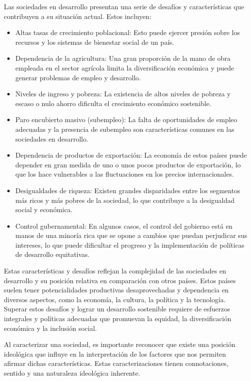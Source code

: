 \documentclass[
  a4paper,
]{article}
\providecommand{\tightlist}{%
  \setlength{\itemsep}{0pt}\setlength{\parskip}{0pt}}\usepackage{longtable,booktabs,array}
\begin{document}
Las sociedades en desarrollo presentan una serie de desafíos y
características que contribuyen a su situación actual. Estos incluyen:

\begin{itemize}
\tightlist
\item
  Altas tasas de crecimiento poblacional: Esto puede ejercer presión
  sobre los recursos y los sistemas de bienestar social de un país.
\item
  Dependencia de la agricultura: Una gran proporción de la mano de obra
  empleada en el sector agrícola limita la diversificación económica y
  puede generar problemas de empleo y desarrollo.
\item
  Niveles de ingreso y pobreza: La existencia de altos niveles de
  pobreza y escaso o nulo ahorro dificulta el crecimiento económico
  sostenible.
\item
  Paro encubierto masivo (subempleo): La falta de oportunidades de
  empleo adecuadas y la presencia de subempleo son características
  comunes en las sociedades en desarrollo.
\item
  Dependencia de productos de exportación: La economía de estos países
  puede depender en gran medida de uno o unos pocos productos de
  exportación, lo que los hace vulnerables a las fluctuaciones en los
  precios internacionales.
\item
  Desigualdades de riqueza: Existen grandes disparidades entre los
  segmentos más ricos y más pobres de la sociedad, lo que contribuye a
  la desigualdad social y económica.
\item
  Control gubernamental: En algunos casos, el control del gobierno está
  en manos de una minoría rica que se opone a cambios que puedan
  perjudicar sus intereses, lo que puede dificultar el progreso y la
  implementación de políticas de desarrollo equitativas.
\end{itemize}

Estas características y desafíos reflejan la complejidad de las
sociedades en desarrollo y su posición relativa en comparación con otros
países. Estos países suelen tener potencialidades productivas
desaprovechadas y dependencia en diversos aspectos, como la economía, la
cultura, la política y la tecnología. Superar estos desafíos y lograr un
desarrollo sostenible requiere de esfuerzos integrales y políticas
adecuadas que promuevan la equidad, la diversificación económica y la
inclusión social.

Al caracterizar una sociedad, es importante reconocer que existe una
posición ideológica que influye en la interpretación de los factores que
nos permiten afirmar dichas características. Estas caracterizaciones
tienen connotaciones, sentido y una naturaleza ideológica inherente.
\end{document}
